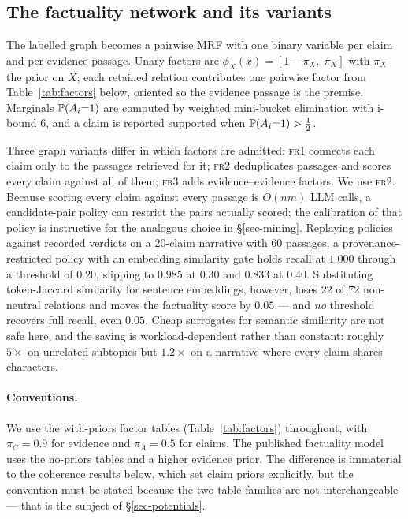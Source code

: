 \subsection{The factuality network and its variants}

The labelled graph becomes a pairwise MRF with one binary variable per claim and per evidence
passage. Unary factors are $\phi_X(x)=[1-\pi_X,\;\pi_X]$ with $\pi_X$ the prior on $X$; each
retained relation contributes one pairwise factor from Table~\ref{tab:factors} below, oriented so
the evidence passage is the premise. Marginals $\mathbb{P}\!\left( A_i{=}1 \right)$ are computed by weighted mini-bucket
elimination \citep{wmb} with i-bound $6$, and a claim is reported supported when
$\mathbb{P}\!\left( A_i{=}1 \right)>\tfrac12$.

Three graph variants differ in which factors are admitted: \textsc{fr1} connects each claim only
to the passages retrieved for it; \textsc{fr2} deduplicates passages and scores every claim
against all of them; \textsc{fr3} adds evidence--evidence factors. We use \textsc{fr2}. Because
scoring every claim against every passage is $O(nm)$ LLM calls, a candidate-pair policy can restrict
the pairs actually scored; the calibration of that policy is instructive for the analogous choice
in \S\ref{sec-mining}. Replaying policies against recorded verdicts on a 20-claim narrative with 60
passages, a provenance-restricted policy with an embedding similarity gate holds recall at $1.000$
through a threshold of $0.20$, slipping to $0.985$ at $0.30$ and $0.833$ at $0.40$. Substituting
token-Jaccard similarity for sentence embeddings, however, loses $22$ of $72$ non-neutral relations
and moves the factuality score by $0.05$ --- and \emph{no} threshold recovers full recall, even
$0.05$. Cheap surrogates for semantic similarity are not safe here, and the saving is
workload-dependent rather than constant: roughly $5\times$ on unrelated subtopics but $1.2\times$
on a narrative where every claim shares characters.

\paragraph{Conventions.} We use the with-priors factor tables (Table~\ref{tab:factors}) throughout,
with $\pi_C=0.9$ for evidence and $\pi_A=0.5$ for claims. The published factuality model uses the
no-priors tables and a higher evidence prior. The difference is immaterial to the coherence results
below, which set claim priors explicitly, but the convention must be stated because the two table
families are not interchangeable --- that is the subject of \S\ref{sec-potentials}.


